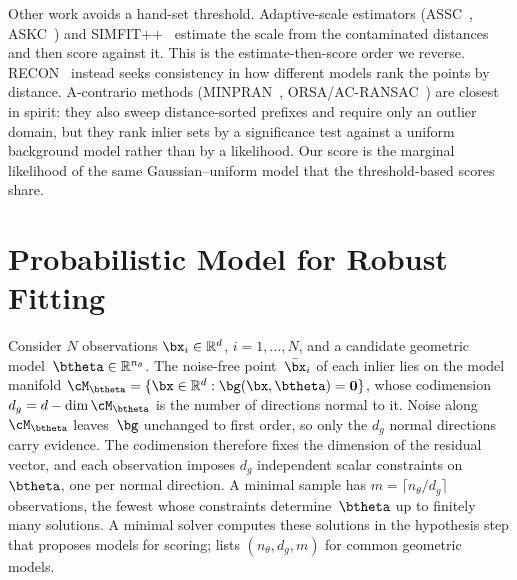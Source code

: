 \documentclass{article}
\newcommand{\bzero}{\mathbf{0}}             %
\newcommand{\Reals}{\mathbb{R}}
\newcommand{\mname}[1]{\texorpdfstring{#1\xspace}{#1}}
\newcommand{\pp}{\nolinebreak[4]\hspace{-0.05em}+\nolinebreak[4]\hspace{-0.05em}+}
\newcommand{\minpran}{\mname{MINPRAN}}
\newcommand{\orsa}{\mname{ORSA}}
\newcommand{\acransac}{\mname{AC-RANSAC}}
\newcommand{\recon}{\mname{RECON}}
\newcommand{\assc}{\mname{ASSC}}
\newcommand{\askc}{\mname{ASKC}}
\newcommand{\simfitpp}{\texorpdfstring{SIMFIT\pp\xspace}{SIMFIT++}}
\newcommand{\gaussunif}{Gaussian--uniform\xspace}
\begin{document}
Other work avoids a hand-set threshold.  Adaptive-scale estimators
(\assc~\cite{Wang2004}, \askc~\cite{Wang2010}) and
\simfitpp~\cite{Edstedt2025} estimate the scale from the contaminated
distances and then score against it. This is the estimate-then-score
order we reverse.  \recon~\cite{Raguram2011} instead seeks consistency
in how different models rank the points by distance.  A-contrario
methods (\minpran~\cite{Stewart1995},
\orsa/\acransac~\cite{Moisan2004,Moisan2012}) are closest in spirit:
they also sweep distance-sorted prefixes and require only an outlier
domain, but they rank inlier sets by a significance test against a
uniform background model rather than by a likelihood.  Our score is
the marginal likelihood of the same \gaussunif model that the
threshold-based scores share.


\section{Probabilistic Model for Robust Fitting}
\label{sec:partition}
Consider $N$ observations $\bx_i \in \Reals^d$, $i = 1,\ldots,N$, and
a candidate geometric model~$\btheta \in \Reals^{n_\theta}$.  The
noise-free point~$\bar\bx_i$ of each inlier lies on the model manifold
$\cM_{\btheta} = \{\bx \in \Reals^d : \bg(\bx,\btheta) = \bzero\}$,
whose codimension $d_g = d - \dim\cM_{\btheta}$ is the number of
directions normal to it.  Noise along~$\cM_{\btheta}$ leaves~$\bg$
unchanged to first order, so only the $d_g$ normal directions carry
evidence.  The codimension therefore fixes the dimension of the
residual vector, and each observation imposes $d_g$ independent scalar
constraints on~$\btheta$, one per normal direction.  A minimal sample
has $m = \lceil n_\theta/d_g \rceil$ observations, the fewest whose
constraints determine~$\btheta$ up to finitely many solutions.  A
minimal solver computes these solutions in the hypothesis step that
proposes models for scoring;  lists $(n_\theta,
	d_g, m)$ for common geometric models.
\end{document}
